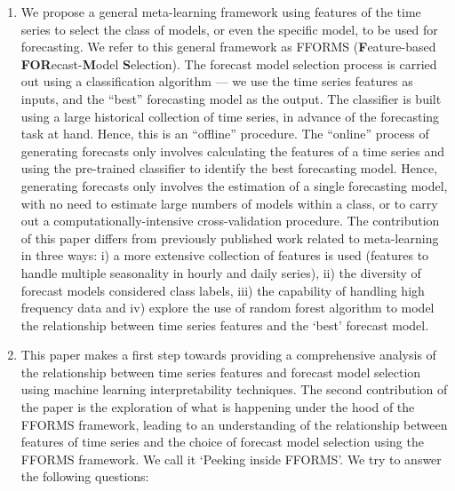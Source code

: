 \documentclass[11pt,a4paper,]{article}
\begin{document}
\begin{enumerate}
\def\labelenumi{\arabic{enumi}.}
\item
  We propose a general meta-learning framework using features of the time series to select the class of models, or even the specific model, to be used for forecasting. We refer to this general framework as FFORMS (\textbf{F}eature-based \textbf{FOR}ecast-\textbf{M}odel \textbf{S}election). The forecast model selection process is carried out using a classification algorithm --- we use the time series features as inputs, and the ``best'' forecasting model as the output. The classifier is built using a large historical collection of time series, in advance of the forecasting task at hand. Hence, this is an ``offline'' procedure. The ``online'' process of generating forecasts only involves calculating the features of a time series and using the pre-trained classifier to identify the best forecasting model. Hence, generating forecasts only involves the estimation of a single forecasting model, with no need to estimate large numbers of models within a class, or to carry out a computationally-intensive cross-validation procedure. The contribution of this paper differs from previously published work related to meta-learning \autocites{prudencio2004meta}{lemke2010meta}{kuck2016meta} in three ways: i) a more extensive collection of features is used (features to handle multiple seasonality in hourly and daily series), ii) the diversity of forecast models considered class labels, iii) the capability of handling high frequency data and iv) explore the use of random forest algorithm to model the relationship between time series features and the `best' forecast model.
\item
  This paper makes a first step towards providing a comprehensive analysis of the relationship between time series features and forecast model selection using machine learning interpretability techniques. The second contribution of the paper is the exploration of what is happening under the hood of the FFORMS framework, leading to an understanding of the relationship between features of time series and the choice of forecast model selection using the FFORMS framework. We call it `Peeking inside FFORMS'. We try to answer the following questions:


\end{enumerate}
\end{document}
